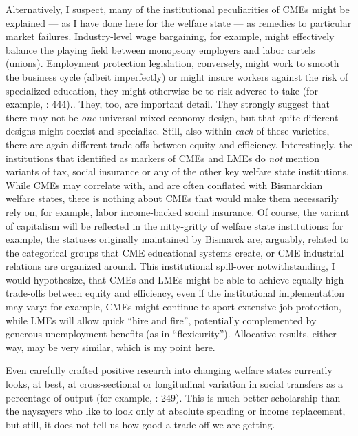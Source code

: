 \begin{enumerate}
{		Alternatively, I suspect, many of the institutional peculiarities of \glspl{CME} might be explained --- as I have done here for the welfare state --- as remedies to particular market failures. Industry-level wage bargaining, for example, might effectively balance the playing field between monopsony employers and labor cartels (unions). Employment protection legislation, conversely, might work to smooth the business cycle (albeit imperfectly) or might insure workers against the risk of specialized education, they might otherwise be to risk-adverse to take (for example, \citealt{Offe2003}: 444).}. 
	They, too, are important detail. They strongly suggest that there may not be \emph{one} universal mixed economy design, but that quite different designs might coexist and specialize. Still, also within \emph{each} of these varieties, there are again different trade-offs between equity and efficiency. Interestingly, the institutions that \citeauthor{HallSoskice-2001-aa} identified as markers of \glspl{CME} and \glspl{LME} do \emph{not} mention variants of tax, social insurance or any of the other key welfare state institutions. While \glspl{CME} may correlate with, and are often conflated with Bismarckian welfare states, there is nothing about \glspl{CME} that would make them necessarily rely on, for example, labor income-backed social insurance. Of course, the variant of capitalism will be reflected in the nitty-gritty of welfare state institutions: for example, the statuses originally maintained by Bismarck are, arguably, related to the categorical groups that \gls{CME} educational systems create, or \gls{CME} industrial relations are organized around. This institutional spill-over notwithstanding, I would hypothesize, that \glspl{CME} and \glspl{LME} might be able to achieve equally high trade-offs between equity and efficiency, even if the institutional implementation may vary: for example, \glspl{CME} might continue to sport extensive job protection, while \glspl{LME} will allow quick ``hire and fire'', potentially complemented by generous unemployment benefits (as in ``flexicurity''). Allocative results, either way, may be very similar, which is my point here.
	
	Even carefully crafted positive research into changing welfare states currently looks, at best, at cross-sectional or longitudinal variation in social transfers as a percentage of output (for example, \citealt{Ravenhill2005}: 249). This is much better scholarship than the naysayers who like to look only at absolute spending or income replacement, but still, it does not tell us how good a trade-off we are getting.
	

\end{enumerate}

